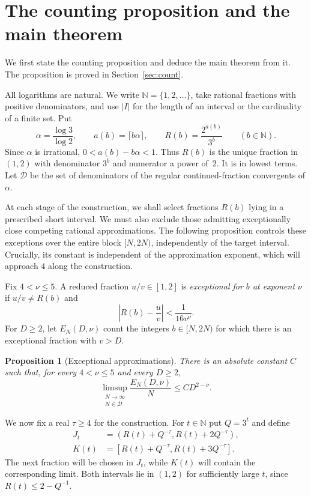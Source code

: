 \documentclass[11pt,reqno]{amsart}
\newtheorem{proposition}[lemma]{Proposition}
\theoremstyle{definition}
\newcommand{\N}{\mathbb N}
\newcommand{\DD}{\mathcal D}
\begin{document}
\section{The counting proposition and the main theorem}
\label{sec:main}

We first state the counting proposition and deduce the main theorem from it. The proposition is proved in Section~\ref{sec:count}.

All logarithms are natural. We write $\N=\{1,2,\ldots\}$,
take rational fractions with positive denominators, and
use $|I|$ for the length of an interval or the cardinality
of a finite set. Put
\[
 \alpha=\frac{\log 3}{\log 2},\qquad
 a(b)=\lceil b\alpha\rceil,\qquad
 R(b)=\frac{2^{a(b)}}{3^b}\qquad(b\in\N).
\]
Since $\alpha$ is irrational, $0<a(b)-b\alpha<1$.
Thus $R(b)$ is the unique fraction in $(1,2)$ with
denominator $3^b$ and numerator a power of~$2$.
It is in lowest terms. Let $\DD$ be the set of
denominators of the regular continued-fraction
convergents of $\alpha$.

At each stage of the construction, we shall select fractions
$R(b)$ lying in a prescribed short interval. We must also
exclude those admitting exceptionally close competing rational
approximations. The following proposition controls these
exceptions over the entire block $[N,2N)$, independently
of the target interval. Crucially, its constant is independent
of the approximation exponent, which will approach $4$
along the construction.

Fix $4<\nu\le5$. A reduced fraction $u/v\in[1,2]$ is
\emph{exceptional for $b$ at exponent $\nu$} if
$u/v\ne R(b)$ and
\begin{equation}\label{eq:exception}
 \left|R(b)-\frac uv\right|<\frac1{16v^\nu}.
\end{equation}
For $D\ge2$, let $E_N(D,\nu)$ count the integers
$b\in[N,2N)$ for which there is an exceptional
fraction with $v>D$.

\begin{proposition}[Exceptional approximations]
\label{prop:count}
There is an absolute constant $C$ such that, for every
$4<\nu\le5$ and every $D\ge2$,
\[
 \limsup_{\substack{N\to\infty\\N\in\DD}}
 \frac{E_N(D,\nu)}{N}\le CD^{2-\nu}.
\]
\end{proposition}

We now fix a real $\tau\ge4$ for the construction.
For $t\in\mathbb N$ put $Q=3^t$ and define
\[
 \begin{aligned}
 J_t&=(R(t)+Q^{-\tau},R(t)+2Q^{-\tau}),\\
 K(t)&=[R(t)+Q^{-\tau},R(t)+3Q^{-\tau}].
 \end{aligned}
\]
The next fraction will be chosen in $J_t$, while $K(t)$
will contain the corresponding limit. Both intervals lie
in $(1,2)$ for sufficiently large $t$, since
$R(t)\le2-Q^{-1}$.
\end{document}
